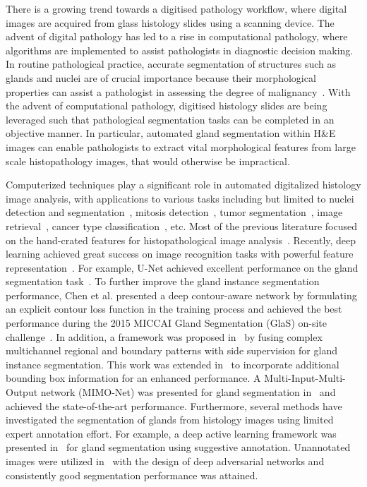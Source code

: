 \documentclass[3p]{elsarticle}
\begin{document}
There is a growing trend towards a digitised pathology workflow, where digital images are acquired from glass histology slides using a scanning device. The advent of digital pathology has led to a rise in computational pathology, where algorithms are implemented to assist pathologists in diagnostic decision making. In routine pathological practice, accurate segmentation of structures such as glands and nuclei are of crucial importance because their morphological properties can assist a pathologist in assessing the degree of malignancy~\citep{compton2000updated,hamilton2000pathology,washington2009protocol}. With the advent of computational pathology, digitised histology slides are being leveraged such that pathological segmentation tasks can be completed in an objective manner. In particular, automated gland segmentation within H\&E images can enable pathologists to extract vital morphological features from large scale histopathology images, that would otherwise be impractical.

Computerized techniques play a significant role in automated digitalized histology image analysis, with applications to various tasks including but limited to nuclei detection and segmentation~\citep{graham2018sams,chen2017dcan,sirinukunwattana2016locality}, mitosis detection~\citep{cirecsan2013mitosis,chen2016mitosis,veta2015assessment,albarqouni2016aggnet}, tumor segmentation~\citep{qaiser2017tumor}, image retrieval~\citep{sapkota2018deep,shi2017supervised}, cancer type classification~\citep{graham2018classification,kong2017cancer,bejnordi2017diagnostic,lin2018scannet,qaiser2018her}, etc.
Most of the previous literature focused on the hand-crated features for histopathological image analysis~\citep{gurcan2009histopathological}. 
Recently, deep learning achieved great success on image recognition tasks with powerful feature representation~\citep{litjens2017survey,shen2017deep,lecun2015deep}. 
For example, U-Net achieved excellent performance on the gland segmentation task~\citep{ronneberger2015u}. To further improve the gland instance segmentation performance, Chen et al. presented a deep contour-aware network by formulating an explicit contour loss function in the training process and achieved the best performance during the 2015 MICCAI Gland Segmentation (GlaS) on-site challenge~\citep{chen2016dcan,chen2017dcan,sirinukunwattana2017gland}.
In addition, a framework was proposed in~\cite{xu2016gland} by fusing complex multichannel regional and boundary patterns with side supervision for gland instance segmentation. This work was extended in~\cite{xu2017gland} to incorporate additional bounding box information for an enhanced performance.
A Multi-Input-Multi-Output network (MIMO-Net) was presented for gland segmentation in~\cite{raza2017mimonet} and achieved the state-of-the-art performance.
Furthermore, several methods have investigated the segmentation of glands from histology images using limited expert annotation effort. For example, a deep active learning framework was presented in~\cite{yang2017suggestive} for gland segmentation using suggestive annotation. Unannotated images were utilized in~\cite{zhang2017deep} with the design of deep adversarial networks and consistently good segmentation performance was attained.
\end{document}

